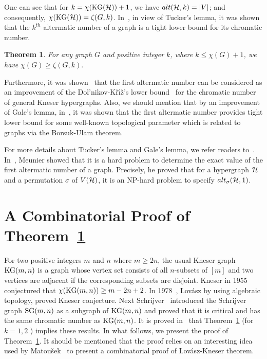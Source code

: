 \documentclass[11pt]{article}
\newtheorem{prealphthm}{{\bf Theorem}}
\newenvironment{alphthm}{\begin{prealphthm}{\hspace{-0.5
               em}{\bf.\ }}}{\end{prealphthm}}
\begin{document}
One can see that for $k= \chi({\rm KG}({\cal H}))+1$, we have $alt({\cal H},k)=|V|$; and consequently, $\chi({\rm KG}({\cal H}))=\zeta(G,k)$.
In~\cite{2013arXiv1302.5394A}, in view of Tucker's lemma, it was shown that the $k^{th}$ altermatic number of a graph is a tight lower bound for its chromatic number.
\begin{alphthm}\label{combin}{\rm \cite{2013arXiv1302.5394A}}
For any graph $G$ and positive integer $k$, where $k\leq\chi(G)+1$, we have
$\chi(G)\geq \zeta(G,k).$
\end{alphthm}
Furthermore, it was shown~\cite{2013arXiv1302.5394A} that the first altermatic number can be considered as an improvement
of the Dol'nikov-K{\v{r}}{\'{\i}}{\v{z}}'s lower bound~\cite{MR953021, MR1081939} for the chromatic number of
general Kneser hypergraphs.  Also, we should mention that by an improvement of Gale's lemma,  in~\cite{2014arXiv1403.4404A}, it was shown  that the
first altermatic number provides tight lower bound for some well-known topological parameter which is related to graphs via the Borsuk-Ulam theorem.

For more details about Tucker's lemma and Gale's lemma, we refer readers to~\cite{2014arXiv1403.4404A,MR1988723}. In~\cite{2013arXiv1306.1112M}, Meunier showed that
it is a hard problem to determine the exact value of the first altermatic number of a graph. Precisely, he proved  that for a hypergraph ${\cal H}$ and
a permutation $\sigma$ of $V({\cal H})$,
it is an NP-hard problem to specify $alt_\sigma({\cal H},1)$.

\section{A Combinatorial Proof of Theorem~\ref{combin}}
For two positive integers $m$ and $n$ where $m\geq 2n$,
the usual Kneser graph ${\rm KG}(m,n)$ is a graph whose vertex set consists of all
$n$-subsets of $[m]$ and two vertices are adjacent if the corresponding subsets are disjoint.
Kneser  in 1955~\cite{MR0068536} conjectured that $\chi({\rm KG}(m,n))\geq m-2n+2$.
In 1978~\cite{MR514625}, Lov\'asz by using algebraic topology, proved Kneser conjecture. Next Schrijver~\cite{MR512648} introduced  the Schrijver graph ${\rm SG}(m,n)$ as a subgraph  of ${\rm KG}(m,n)$ and proved that it is  critical  and has the same chromatic number as ${\rm KG}(m,n)$.
It is proved in~\cite{2013arXiv1302.5394A} that Theorem~\ref{combin} (for $k=1,2$ ) implies these results. In what follows, we present the proof of Theorem~\ref{combin}.
It should be mentioned that the proof relies on an interesting idea used by Matou{\v{s}}ek~\cite{MR2057690}
to present a combinatorial proof of Lov\'asz-Kneser theorem.
\end{document}
